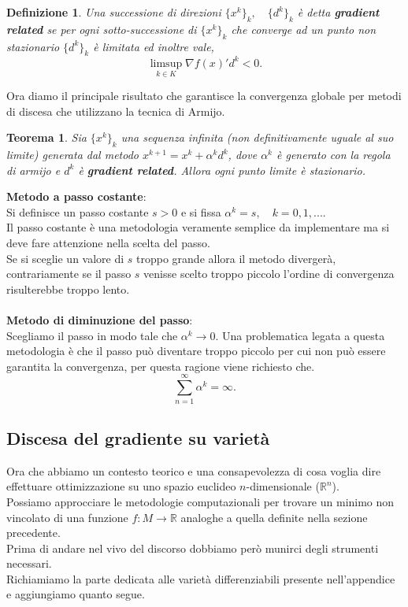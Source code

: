 \documentclass[a4paper, 12pt]{article}
\newtheorem{theorem}{Teorema}
\newtheorem{definition}{Definizione}
\begin{document}
\begin{definition}
Una successione di direzioni $\{x^k\}_k, \quad \{d^k\}_k$ è detta \textbf{gradient related} se per ogni sotto-successione di $\{x^k\}_k$ che converge ad un punto non stazionario $\{d^k\}_k$ è limitata ed inoltre vale,\\
\[\limsup\limits_{k \in K} \nabla f(x)'d^k < 0.\]
\end{definition}
Ora diamo il principale risultato che garantisce la convergenza globale per metodi di discesa che utilizzano la tecnica di Armijo.
\begin{theorem}
Sia $\{x^k\}_k$ una sequenza infinita (non definitivamente uguale al suo limite) generata dal metodo $x^{k+1} = x^k + \alpha^k d^k$, dove $\alpha^k$ è generato con la regola di armijo e $d^k$ è \textbf{gradient related}. Allora ogni punto limite è stazionario.
\end{theorem}
\textbf{Metodo a passo costante}:\\
Si definisce un passo costante $s > 0$ e si fissa $\alpha^k = s, \quad k = 0,1, ...$.\\
Il passo costante è una metodologia veramente semplice da implementare ma si deve fare attenzione nella scelta del passo.\\
Se si sceglie un valore di $s$ troppo grande allora il metodo divergerà, contrariamente se il passo $s$ venisse scelto troppo piccolo l'ordine di convergenza risulterebbe troppo lento.\\\\
\textbf{Metodo di diminuzione del passo}:\\
Scegliamo il passo in modo tale che $\alpha^k \rightarrow 0$. Una problematica legata a questa metodologia è che il passo può diventare troppo piccolo per cui non può essere garantita la convergenza, per questa ragione viene richiesto che.\\ \[\sum_{n=1}^{\infty} \alpha^k = \infty.\]
\subsection{Discesa del gradiente su varietà} \label{riemanniangd}
Ora che abbiamo un contesto teorico e una consapevolezza di cosa voglia dire effettuare ottimizzazione su uno spazio euclideo $n$-dimensionale ($\mathbb{R}^n$).\\
Possiamo approcciare le metodologie computazionali per trovare un minimo non vincolato di una funzione $f:M \to \mathbb{R}$ analoghe a quella definite nella sezione precedente.\\
Prima di andare nel vivo del discorso dobbiamo però munirci degli strumenti necessari.\\
Richiamiamo la parte dedicata alle varietà differenziabili presente nell'appendice e aggiungiamo quanto segue.
\end{document}

